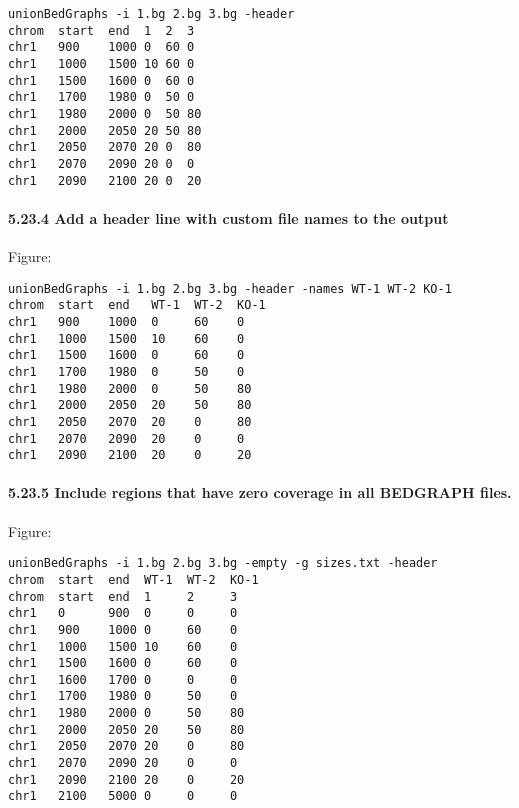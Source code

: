 \documentclass[letterpaper,10pt,english]{sphinxmanual}
\begin{document}
\begin{Verbatim}[commandchars=\\\{\}]
unionBedGraphs -i 1.bg 2.bg 3.bg -header
chrom  start  end  1  2  3
chr1   900    1000 0  60 0
chr1   1000   1500 10 60 0
chr1   1500   1600 0  60 0
chr1   1700   1980 0  50 0
chr1   1980   2000 0  50 80
chr1   2000   2050 20 50 80
chr1   2050   2070 20 0  80
chr1   2070   2090 20 0  0
chr1   2090   2100 20 0  20
\end{Verbatim}


\paragraph{5.23.4 Add a header line with custom file names to the output}
\label{content/unionBedGraphs:add-a-header-line-with-custom-file-names-to-the-output}
Figure:

\begin{Verbatim}[commandchars=\\\{\}]
unionBedGraphs -i 1.bg 2.bg 3.bg -header -names WT-1 WT-2 KO-1
chrom  start  end   WT-1  WT-2  KO-1
chr1   900    1000  0     60    0
chr1   1000   1500  10    60    0
chr1   1500   1600  0     60    0
chr1   1700   1980  0     50    0
chr1   1980   2000  0     50    80
chr1   2000   2050  20    50    80
chr1   2050   2070  20    0     80
chr1   2070   2090  20    0     0
chr1   2090   2100  20    0     20
\end{Verbatim}


\paragraph{5.23.5 Include regions that have zero coverage in all BEDGRAPH files.}
\label{content/unionBedGraphs:include-regions-that-have-zero-coverage-in-all-bedgraph-files}
Figure:

\begin{Verbatim}[commandchars=\\\{\}]
unionBedGraphs -i 1.bg 2.bg 3.bg -empty -g sizes.txt -header
chrom  start  end  WT-1  WT-2  KO-1
chrom  start  end  1     2     3
chr1   0      900  0     0     0
chr1   900    1000 0     60    0
chr1   1000   1500 10    60    0
chr1   1500   1600 0     60    0
chr1   1600   1700 0     0     0
chr1   1700   1980 0     50    0
chr1   1980   2000 0     50    80
chr1   2000   2050 20    50    80
chr1   2050   2070 20    0     80
chr1   2070   2090 20    0     0
chr1   2090   2100 20    0     20
chr1   2100   5000 0     0     0
\end{Verbatim}
\end{document}
